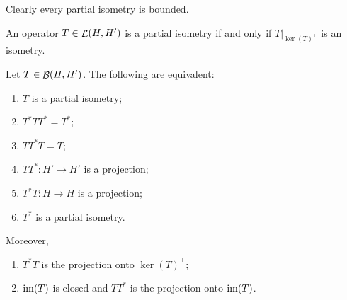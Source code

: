 Clearly every partial isometry is bounded.

\begin{lemma}
An operator $T\in \mathop{\mathcal{L}}(H, H')$ is a partial isometry \textup{if and only if} $T|_{\ker(T)^\perp}$ is an isometry.
\end{lemma}

\begin{proposition} \label{partialIsometryEquivalences}
Let $T\in \mathop{\mathcal{B}}(H,H')$. The following are equivalent:
\begin{enumerate}
\item $T$ is a partial isometry;
\item $T^*TT^* = T^*$;
\item $TT^*T = T$;
\item $TT^*: H' \to H'$ is a projection;
\item $T^*T: H \to H$ is a projection;
\item $T^*$ is a partial isometry.
\end{enumerate}
Moreover,
\begin{enumerate}
\item $T^*T$ is the projection onto $\ker(T)^\perp$;
\item $\operatorname{im}(T)$ is closed and $TT^*$ is the projection onto $\operatorname{im}(T)$.
\end{enumerate}
\end{proposition}
